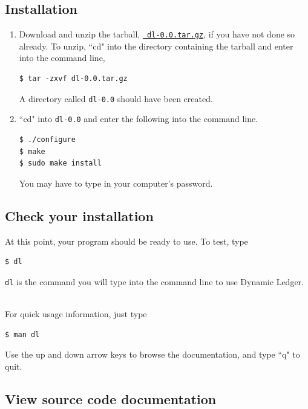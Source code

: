 \documentclass{article}
\providecommand{\q}{$\quad$ \newline}
\begin{document}
\begin{flushleft}
\subsection{Installation}
\begin{enumerate}
\item Download and unzip the tarball, \href{https://github.com/wlandau/dynamic-ledger/blob/master/dl-0.0.tar.gz?raw=true}{{\tt \color{blue} dl-0.0.tar.gz}}, if you have not done so already. To unzip, ``cd" into the directory containing the tarball and enter into the command line,

\begin{lstlisting}
$ tar -zxvf dl-0.0.tar.gz
\end{lstlisting}

A directory called {\tt dl-0.0} should have been created.

\item ``cd" into {\tt dl-0.0} and enter the following into the command line.

\begin{lstlisting}
$ ./configure
$ make
$ sudo make install
\end{lstlisting}

You may have to type in your computer's password.
\end{enumerate}

\subsection{Check your installation}

At this point, your program should be ready to use. To test, type

\begin{lstlisting}
$ dl
\end{lstlisting}

{\tt dl} is the command you will type into the command line to use Dynamic Ledger. \q

For quick usage information, just type

\begin{lstlisting}
$ man dl
\end{lstlisting}

Use the up and down arrow keys to browse the documentation, and type ``q" to quit. 

\subsection{View source code documentation}


\end{flushleft}
\end{document}

